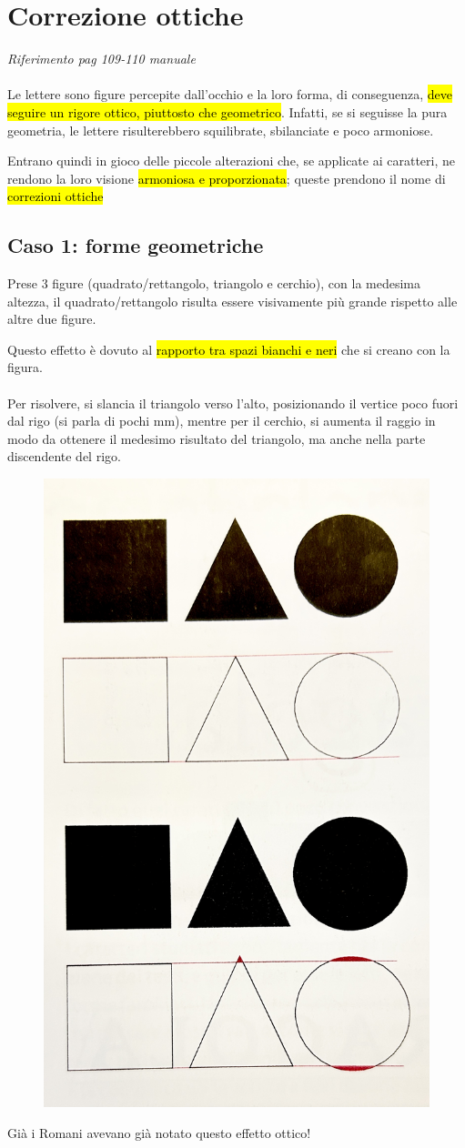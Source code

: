 \chapter{Correzione ottiche}
\textit{Riferimento pag 109-110 manuale}
\\\\
Le lettere sono figure percepite dall'occhio e la loro forma, di conseguenza, \hl{deve seguire un rigore ottico, piuttosto che geometrico}. Infatti, se si seguisse la pura geometria, le lettere risulterebbero squilibrate, sbilanciate e poco armoniose.

Entrano quindi in gioco delle piccole alterazioni che, se applicate ai caratteri, ne rendono la loro visione \hl{armoniosa e proporzionata}; queste prendono il nome di \hl{correzioni ottiche}

\section{Caso 1: forme geometriche}
Prese 3 figure (quadrato/rettangolo, triangolo e cerchio), con la medesima altezza, il quadrato/rettangolo risulta essere visivamente più grande rispetto alle altre due figure.

Questo effetto è dovuto al \hl{rapporto tra spazi bianchi e neri} che si creano con la figura.
\\\\
Per risolvere, si slancia il triangolo verso l'alto, posizionando il vertice poco fuori dal rigo (si parla di pochi mm), mentre per il cerchio, si aumenta il raggio in modo da ottenere il medesimo risultato del triangolo, ma anche nella parte discendente del rigo.
\begin{figure}[H]
    \centering
    \includegraphics[width=0.3\linewidth]{blocco_2 - spiegazioni teorico-pratiche/imgs/IMG_4754.jpg}
\end{figure}
\begin{mdframed}[style=mystyle,frametitle=Curiosità]
Già i Romani avevano già notato questo effetto ottico! 
\end{mdframed}

